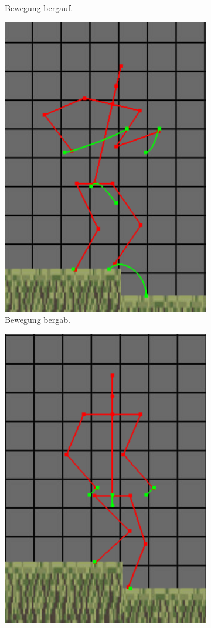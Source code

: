 \begin{figure}
\begin{subfigure}[t]{.4\linewidth}
        \caption{Bewegung bergauf.}
        \label{uphill}
    \end{subfigure}
    \begin{subfigure}[t]{.4\linewidth}
        \centering
        \includegraphics[width=0.75\linewidth]{images/going_down1.png}
        \caption{Bewegung bergab.}
        \label{downhill}
    \end{subfigure}
    \begin{subfigure}[t]{.4\linewidth}
        \centering
        \includegraphics[width=0.75\linewidth]{images/standing_uneven.png}

\end{subfigure}
\end{figure}
